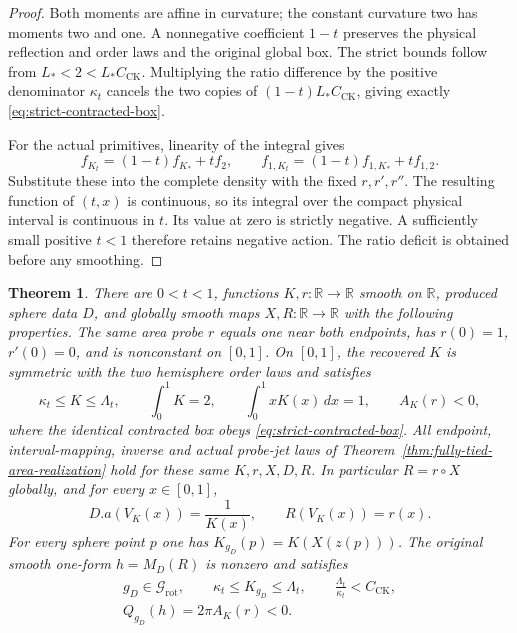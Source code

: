 \documentclass[11pt]{article}
\newtheorem{theorem}{Theorem}[section]
\newcommand{\R}{\mathbb R}
\begin{document}
\begin{proof}
Both moments are affine in curvature; the constant curvature two has
moments two and one. A nonnegative coefficient $1-t$ preserves the
physical reflection and order laws and the original global box.
The strict bounds follow from $L_*<2<L_*C_{\mathrm{CK}}$.
Multiplying the ratio difference by the positive denominator $\kappa_t$
cancels the two copies of $(1-t)L_*C_{\mathrm{CK}}$, giving exactly
\eqref{eq:strict-contracted-box}.

For the actual primitives, linearity of the integral gives
\[
 f_{K_t}=(1-t)f_{K_*}+t f_2,\qquad
 f_{1,K_t}=(1-t)f_{1,K_*}+t f_{1,2}.
\]
Substitute these into the complete density with the fixed $r,r',r''$.
The resulting function of $(t,x)$ is continuous, so its integral over the
compact physical interval is continuous in $t$. Its value at zero is
strictly negative. A sufficiently small positive $t<1$ therefore retains
negative action. The ratio deficit is obtained before any smoothing.
\end{proof}

\begin{theorem}\label{thm:smooth-subcritical-negative-witness}
There are $0<t<1$, functions $K,r:\R\to\R$ smooth on $\R$, produced
sphere data $D$, and globally smooth maps $X,R:\R\to\R$ with the following
properties. The same area probe $r$ equals one near both endpoints, has
$r(0)=1$, $r'(0)=0$, and is nonconstant on $[0,1]$.
On $[0,1]$, the recovered $K$ is symmetric with the two hemisphere order
laws and satisfies
\[
 \kappa_t\leq K\leq\Lambda_t,\qquad
 \int_0^1K=2,\qquad \int_0^1xK(x)\,dx=1,\qquad A_K(r)<0,
\]
where the identical contracted box obeys \eqref{eq:strict-contracted-box}.
All endpoint, interval-mapping, inverse and actual probe-jet laws of
Theorem~\ref{thm:fully-tied-area-realization} hold for these same $K,r,X,D,R$.
In particular $R=r\circ X$ globally, and for every $x\in[0,1]$,
\[
 D.a(V_K(x))=\frac1{K(x)},\qquad R(V_K(x))=r(x).
\]
For every sphere point $p$ one has $K_{g_D}(p)=K(X(z(p)))$.
The original smooth one-form $h=M_D(R)$ is nonzero and satisfies
\begin{equation}\label{eq:strict-negative-geometric-witness}
 \begin{gathered}
 g_D\in\mathcal G_{\mathrm{rot}},\qquad
 \kappa_t\leq K_{g_D}\leq\Lambda_t,\qquad
 \frac{\Lambda_t}{\kappa_t}<C_{\mathrm{CK}},\\
 Q_{g_D}(h)=2\pi A_K(r)<0.
 \end{gathered}
\end{equation}
\end{theorem}
\end{document}
